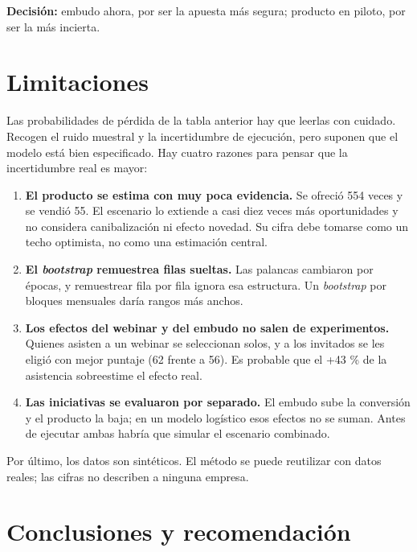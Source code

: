 \documentclass[11pt,letterpaper]{article}
\begin{document}
\textbf{Decisión:} embudo ahora, por ser la apuesta más segura; producto en piloto, por ser la más incierta.

\section{Limitaciones}

Las probabilidades de pérdida de la tabla anterior hay que leerlas con cuidado. Recogen el ruido muestral y la
incertidumbre de ejecución, pero suponen que el modelo está bien especificado. Hay cuatro razones para pensar que
la incertidumbre real es mayor:

\begin{enumerate}
  \item \textbf{El producto se estima con muy poca evidencia.} Se ofreció 554 veces y se vendió 55. El escenario lo
        extiende a casi diez veces más oportunidades y no considera canibalización ni efecto novedad. Su cifra
        debe tomarse como un techo optimista, no como una estimación central.
  \item \textbf{El \textit{bootstrap} remuestrea filas sueltas.} Las palancas cambiaron por épocas, y remuestrear
        fila por fila ignora esa estructura. Un \textit{bootstrap} por bloques mensuales daría rangos más anchos.
  \item \textbf{Los efectos del webinar y del embudo no salen de experimentos.} Quienes asisten a un webinar se
        seleccionan solos, y a los invitados se les eligió con mejor puntaje (62 frente a 56). Es probable que el
        +43 \% de la asistencia sobreestime el efecto real.
  \item \textbf{Las iniciativas se evaluaron por separado.} El embudo sube la conversión y el producto la baja; en
        un modelo logístico esos efectos no se suman. Antes de ejecutar ambas habría que simular el escenario
        combinado.
\end{enumerate}

Por último, los datos son sintéticos. El método se puede reutilizar con datos reales; las cifras no describen
a ninguna empresa.

\section{Conclusiones y recomendación}
\end{document}
